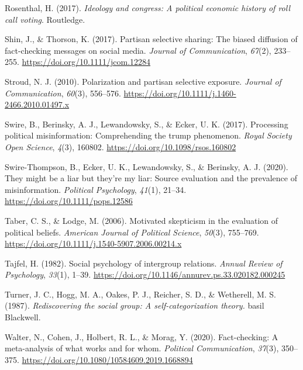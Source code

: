 \documentclass[
  12pt,
]{article}
\newlength{\cslhangindent}
\newlength{\cslentryspacingunit} %
\newenvironment{CSLReferences}[2] %
 {%
  \setlength{\parindent}{0pt}
  \ifodd #1
  \let\oldpar\par
  \def\par{\hangindent=\cslhangindent\oldpar}
  \fi
  \setlength{\parskip}{#2\cslentryspacingunit}
 }%
 {}
\begin{document}
\begin{CSLReferences}{1}{0}
\leavevmode{}%
Rosenthal, H. (2017). \emph{Ideology and congress: A political economic
history of roll call voting}. Routledge.

\leavevmode{}%
Shin, J., \& Thorson, K. (2017). Partisan selective sharing: The biased
diffusion of fact-checking messages on social media. \emph{Journal of
Communication}, \emph{67}(2), 233--255.
\url{https://doi.org/10.1111/jcom.12284}

\leavevmode{}%
Stroud, N. J. (2010). Polarization and partisan selective exposure.
\emph{Journal of Communication}, \emph{60}(3), 556--576.
\url{https://doi.org/10.1111/j.1460-2466.2010.01497.x}

\leavevmode{}%
Swire, B., Berinsky, A. J., Lewandowsky, S., \& Ecker, U. K. (2017).
Processing political misinformation: Comprehending the trump phenomenon.
\emph{Royal Society Open Science}, \emph{4}(3), 160802.
\url{https://doi.org/10.1098/rsos.160802}

\leavevmode{}%
Swire-Thompson, B., Ecker, U. K., Lewandowsky, S., \& Berinsky, A. J.
(2020). They might be a liar but they're my liar: Source evaluation and
the prevalence of misinformation. \emph{Political Psychology},
\emph{41}(1), 21--34. \url{https://doi.org/10.1111/pops.12586}

\leavevmode{}%
Taber, C. S., \& Lodge, M. (2006). Motivated skepticism in the
evaluation of political beliefs. \emph{American Journal of Political
Science}, \emph{50}(3), 755--769.
\url{https://doi.org/10.1111/j.1540-5907.2006.00214.x}

\leavevmode{}%
Tajfel, H. (1982). Social psychology of intergroup relations.
\emph{Annual Review of Psychology}, \emph{33}(1), 1--39.
\url{https://doi.org/10.1146/annurev.ps.33.020182.000245}

\leavevmode{}%
Turner, J. C., Hogg, M. A., Oakes, P. J., Reicher, S. D., \& Wetherell,
M. S. (1987). \emph{Rediscovering the social group: A
self-categorization theory.} basil Blackwell.

\leavevmode{}%
Walter, N., Cohen, J., Holbert, R. L., \& Morag, Y. (2020).
Fact-checking: A meta-analysis of what works and for whom.
\emph{Political Communication}, \emph{37}(3), 350--375.
\url{https://doi.org/10.1080/10584609.2019.1668894}


\end{CSLReferences}
\end{document}
